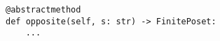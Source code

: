 \par\begin{minipage}{60ex}
\begin{verbatim}
@abstractmethod
def opposite(self, s: str) -> FinitePoset:
    ...
\end{verbatim}
\end{minipage}\par